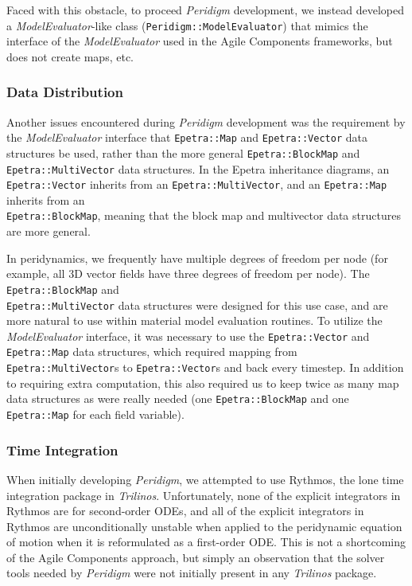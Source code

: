 \documentclass[pdf,ps2pdf,12pt,report]{SANDreport}
\theoremstyle{plain}
\theoremstyle{definition}
\theoremstyle{remark}
\numberwithin{equation}{section}
\begin{document}
Faced with this obstacle, to proceed \emph{Peridigm} development, we instead developed a \emph{ModelEvaluator}-like class (\verb"Peridigm::ModelEvaluator") that mimics the interface of the \emph{ModelEvaluator} used in the Agile Components frameworks, but does not create maps, etc.

\subsubsection{Data Distribution}

Another issues encountered during \emph{Peridigm} development was the requirement by the \emph{ModelEvaluator} interface that \verb"Epetra::Map" and \verb"Epetra::Vector" data structures be used, rather than the more general \verb"Epetra::BlockMap" and \verb"Epetra::MultiVector" data structures. In the Epetra inheritance diagrams, an \verb"Epetra::Vector" inherits from an \verb"Epetra::MultiVector", and an \verb"Epetra::Map" inherits from an \\ \verb"Epetra::BlockMap", meaning that the block map and multivector data structures are more general.

In peridynamics, we frequently have multiple degrees of freedom per node (for example, all 3D vector fields have three degrees of freedom per node). The \verb"Epetra::BlockMap" and \\
\verb"Epetra::MultiVector" data structures were designed for this use case, and are more natural to use within material model evaluation routines. To utilize the \emph{ModelEvaluator} interface, it was necessary to use the \verb"Epetra::Vector" and \verb"Epetra::Map" data structures, which required mapping from \verb"Epetra::MultiVector"s to \verb"Epetra::Vector"s and back every timestep. In addition to requiring extra computation, this also required us to keep twice as many map data structures as were really needed (one \verb"Epetra::BlockMap" and one \verb"Epetra::Map" for each field variable).

\subsubsection{Time Integration}

When initially developing \emph{Peridigm}, we attempted to use Rythmos, the lone time integration package in \emph{Trilinos}. Unfortunately, none of the explicit integrators in Rythmos are for second-order ODEs, and all of the explicit integrators in Rythmos are unconditionally unstable when applied to the peridynamic equation of motion when it is reformulated as a first-order ODE. This is not a shortcoming of the Agile Components approach, but simply an observation that the solver tools needed by \emph{Peridigm} were not initially present in any \emph{Trilinos} package.
\end{document}
